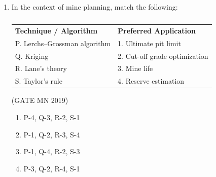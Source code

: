 \documentclass[journal]{IEEEtran}
\begin{document}
\begin{enumerate}
\hfill(GATE MN 2019)
\begin{multicols}{2}
\begin{enumerate}
  \item P-C-1, Q-D-3, R-A-2, S-B-4  
  \item P-C-1, Q-A-3, R-B-4, S-D-2  
  \item P-C-1, Q-A-4, R-B-3, S-D-2  
  \item P-B-3, Q-C-2, R-A-1, S-D-4  
\end{enumerate}
\end{multicols}



\item In the context of mine planning, match the following:

  \begin{table}[H]
    \centering\normalsize
\begin{tabular}{| m{6cm} | m{7cm} |}

\textbf{Technique / Algorithm} & \textbf{Preferred Application} \\

P. Lerchs–Grossman algorithm & 1. Ultimate pit limit \\
Q. Kriging & 2. Cut-off grade optimization \\
R. Lane’s theory & 3. Mine life \\
S. Taylor’s rule & 4. Reserve estimation \\

\end{tabular}

\caption{}
    \label{tab:Q41}
\end{table}

\hfill(GATE MN 2019)
\begin{multicols}{2}
\begin{enumerate}
\item P-4, Q-3, R-2, S-1
\item P-1, Q-2, R-3, S-4
\item P-1, Q-4, R-2, S-3
\item P-3, Q-2, R-4, S-1
\end{enumerate}
\end{multicols}



\end{enumerate}
\end{document}
